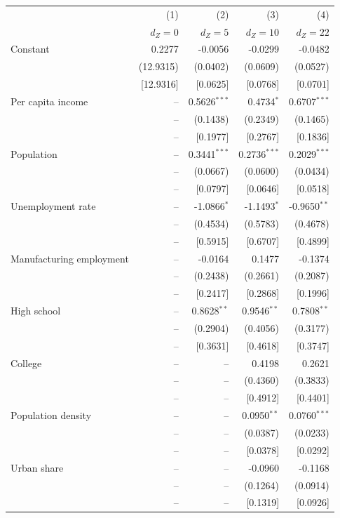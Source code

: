 \begin{tabular}{lrrrr}
\toprule
& (1) & (2) & (3) & (4) \\
& $d_Z = 0$ & $d_Z = 5$ & $d_Z = 10$ & $d_Z = 22$ \\
\midrule
Constant & 0.2277 & -0.0056 & -0.0299 & -0.0482 \\
 & (12.9315) & (0.0402) & (0.0609) & (0.0527) \\
 & [12.9316] & [0.0625] & [0.0768] & [0.0701] \\
Per capita income & -- & 0.5626$^{***}$ & 0.4734$^{*}$ & 0.6707$^{***}$ \\
 & -- & (0.1438) & (0.2349) & (0.1465) \\
 & -- & [0.1977] & [0.2767] & [0.1836] \\
Population & -- & 0.3441$^{***}$ & 0.2736$^{***}$ & 0.2029$^{***}$ \\
 & -- & (0.0667) & (0.0600) & (0.0434) \\
 & -- & [0.0797] & [0.0646] & [0.0518] \\
Unemployment rate & -- & -1.0866$^{*}$ & -1.1493$^{*}$ & -0.9650$^{**}$ \\
 & -- & (0.4534) & (0.5783) & (0.4678) \\
 & -- & [0.5915] & [0.6707] & [0.4899] \\
Manufacturing employment & -- & -0.0164 & 0.1477 & -0.1374 \\
 & -- & (0.2438) & (0.2661) & (0.2087) \\
 & -- & [0.2417] & [0.2868] & [0.1996] \\
High school & -- & 0.8628$^{**}$ & 0.9546$^{**}$ & 0.7808$^{**}$ \\
 & -- & (0.2904) & (0.4056) & (0.3177) \\
 & -- & [0.3631] & [0.4618] & [0.3747] \\
College & -- & -- & 0.4198 & 0.2621 \\
 & -- & -- & (0.4360) & (0.3833) \\
 & -- & -- & [0.4912] & [0.4401] \\
Population density & -- & -- & 0.0950$^{**}$ & 0.0760$^{***}$ \\
 & -- & -- & (0.0387) & (0.0233) \\
 & -- & -- & [0.0378] & [0.0292] \\
Urban share & -- & -- & -0.0960 & -0.1168 \\
 & -- & -- & (0.1264) & (0.0914) \\
 & -- & -- & [0.1319] & [0.0926] \\

\end{tabular}

